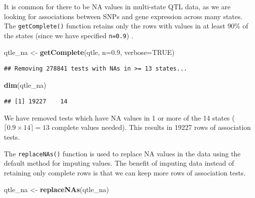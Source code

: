 \documentclass[
]{article}
\newenvironment{Shaded}{\begin{snugshade}}{\end{snugshade}}
\newcommand{\AttributeTok}[1]{\textcolor[rgb]{0.13,0.29,0.53}{#1}}
\newcommand{\ConstantTok}[1]{\textcolor[rgb]{0.56,0.35,0.01}{#1}}
\newcommand{\FloatTok}[1]{\textcolor[rgb]{0.00,0.00,0.81}{#1}}
\newcommand{\FunctionTok}[1]{\textcolor[rgb]{0.13,0.29,0.53}{\textbf{#1}}}
\newcommand{\NormalTok}[1]{#1}
\newcommand{\OtherTok}[1]{\textcolor[rgb]{0.56,0.35,0.01}{#1}}
\begin{document}
It is common for there to be NA values in multi-state QTL data, as we
are looking for associations between SNPs and gene expression across
many states. The \texttt{getComplete()} function retains only the rows
with values in at least 90\% of the states (since we have specified
\texttt{n=0.9}) .

\footnotesize

\normalsize

\footnotesize

\begin{Shaded}
\begin{Highlighting}[]
\NormalTok{qtle\_na }\OtherTok{\textless{}{-}} \FunctionTok{getComplete}\NormalTok{(qtle, }\AttributeTok{n=}\FloatTok{0.9}\NormalTok{, }\AttributeTok{verbose=}\ConstantTok{TRUE}\NormalTok{)}
\end{Highlighting}
\end{Shaded}

\begin{verbatim}
## Removing 278841 tests with NAs in >= 13 states...
\end{verbatim}

\begin{Shaded}
\begin{Highlighting}[]
\FunctionTok{dim}\NormalTok{(qtle\_na)}
\end{Highlighting}
\end{Shaded}

\begin{verbatim}
## [1] 19227    14
\end{verbatim}

\normalsize

We have removed tests which have NA values in 1 or more of the 14 states
(\(\lceil0.9\times 14\rceil = 13\) complete values needed). This results
in 19227 rows of association tests.

The \texttt{replaceNAs()} function is used to replace NA values in the
data using the default method for imputing values. The benefit of
imputing data instead of retaining only complete rows is that we can
keep more rows of association tests. \footnotesize

\begin{Shaded}
\begin{Highlighting}[]
\NormalTok{qtle\_na }\OtherTok{\textless{}{-}} \FunctionTok{replaceNAs}\NormalTok{(qtle\_na)}
\end{Highlighting}
\end{Shaded}

\normalsize
\end{document}
